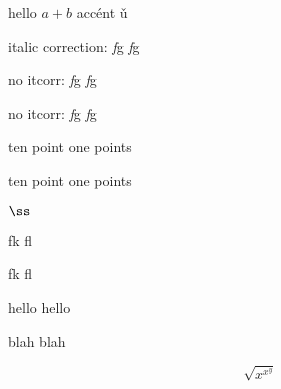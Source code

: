 \documentclass[11pt]{article}
\begin{document}
hello $a+b$ acc\'ent \v u

italic correction: \textit{f}g {\itshape f}g

\def\nocorrlist{g}
no itcorr: \textit{f}g {\itshape f}g

\def\nocorrlist{}
no itcorr: \textit{f\nocorr}g {\itshape f}g

{\fontsize{10.1pt}{10.1pt}\selectfont ten point one points}

{\fontsize{10.1pt}{10.1pt}\selectfont ten point one points}


$\ss$ %

fk fl

\selectfont

fk fl

hello \selectfont hello

blah \fontsize{18.7}{0}\selectfont blah

\[
\sqrt{x^{x^y}}
\]
\end{document}
